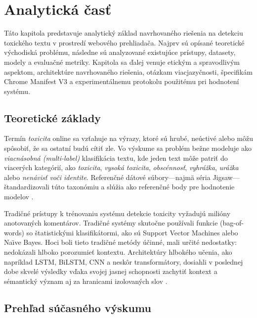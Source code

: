 \chapter{Analytická časť}

Táto kapitola predstavuje analytický základ navrhovaného riešenia na detekciu toxického textu v prostredí webového prehliadača. Najprv sú opísané teoretické východiská problému, následne sú analyzované existujúce prístupy, datasety, modely a evaluačné metriky. Kapitola sa ďalej venuje etickým a spravodlivým aspektom, architektúre navrhovaného riešenia, otázkam viacjazyčnosti, špecifikám Chrome Manifest V3 a experimentálnemu protokolu použitému pri hodnotení systému.

\section{Teoretické základy}
Termín \emph{toxicita} online sa vzťahuje na výrazy, ktoré sú hrubé, neúctivé alebo môžu spôsobiť, že sa ostatní budú cítiť zle. Vo výskume sa problém bežne modeluje ako \emph{viacnásobná (multi-label)} klasifikácia textu, kde jeden text môže patriť do viacerých kategórií, ako \emph{toxicita}, \emph{vysoká toxicita}, \emph{obscénnosť}, \emph{vyhrážka}, \emph{urážka} alebo \emph{nenávisť voči identite}. Referenčné dátové súbory—najmä séria Jigsaw—štandardizovali túto taxonómiu a slúžia ako referenčné body pre hodnotenie modelov \cite{davidson2017hate}\cite{waseem2016hateful}\cite{founta2018large}\cite{zampieri2019offenseval}\cite{tsoumakas2007multilabel}\cite{jigsaw2018toxic}\cite{jigsaw2019bias}\cite{jigsaw2020multilingual}.

Tradičné prístupy k trénovaniu systému detekcie toxicity vyžadujú milióny anotovaných komentárov. Tradičné systémy skutočne používali funkcie (bag-of-words) so štatistickými klasifikátormi, ako sú Support Vector Machines alebo Na\"{\i}ve Bayes. Hoci boli tieto tradičné metódy účinné, mali určité nedostatky: nedokázali hlboko porozumieť kontextu. Architektúry hlbokého učenia, ako napríklad LSTM, BiLSTM, CNN a neskôr transformátory, dosiahli v poslednej dobe skvelé výsledky vďaka svojej jasnej schopnosti zachytiť kontext a sémantický význam aj za hranicami izolovaných slov \cite{davidson2017hate}\cite{waseem2016hateful}\cite{kumar2024eliminating}\cite{sikiandani2025browser}\cite{bert2019}\cite{roberta2019}.

\section{Prehľad súčasného výskumu}\label{sec:related_work}

